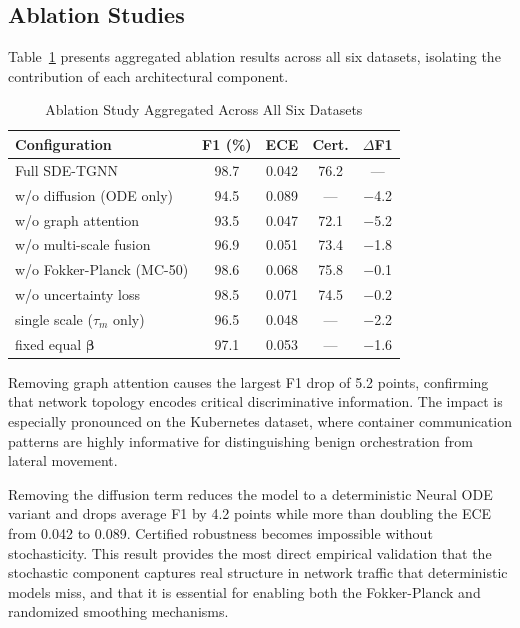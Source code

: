 \documentclass[journal]{IEEEtran}
\begin{document}
\subsection{Ablation Studies}

Table~\ref{tab:ablation} presents aggregated ablation results across all six datasets, isolating the contribution of each architectural component.

\begin{table}[!t]
\centering
\caption{Ablation Study Aggregated Across All Six Datasets}
\label{tab:ablation}
\footnotesize
\begin{tabular}{@{}lcccc@{}}
\toprule
Configuration & F1 (\%) & ECE & Cert. & $\Delta$F1 \\
\midrule
Full SDE-TGNN & 98.7 & 0.042 & 76.2 & --- \\
w/o diffusion (ODE only) & 94.5 & 0.089 & --- & $-$4.2 \\
w/o graph attention & 93.5 & 0.047 & 72.1 & $-$5.2 \\
w/o multi-scale fusion & 96.9 & 0.051 & 73.4 & $-$1.8 \\
w/o Fokker-Planck (MC-50) & 98.6 & 0.068 & 75.8 & $-$0.1 \\
w/o uncertainty loss & 98.5 & 0.071 & 74.5 & $-$0.2 \\
single scale ($\tau_m$ only) & 96.5 & 0.048 & --- & $-$2.2 \\
fixed equal $\boldsymbol{\beta}$ & 97.1 & 0.053 & --- & $-$1.6 \\
\bottomrule
\end{tabular}
\end{table}

Removing graph attention causes the largest F1 drop of 5.2 points, confirming that network topology encodes critical discriminative information. The impact is especially pronounced on the Kubernetes dataset, where container communication patterns are highly informative for distinguishing benign orchestration from lateral movement.

Removing the diffusion term reduces the model to a deterministic Neural ODE variant and drops average F1 by 4.2 points while more than doubling the ECE from 0.042 to 0.089. Certified robustness becomes impossible without stochasticity. This result provides the most direct empirical validation that the stochastic component captures real structure in network traffic that deterministic models miss, and that it is essential for enabling both the Fokker-Planck and randomized smoothing mechanisms.
\end{document}
